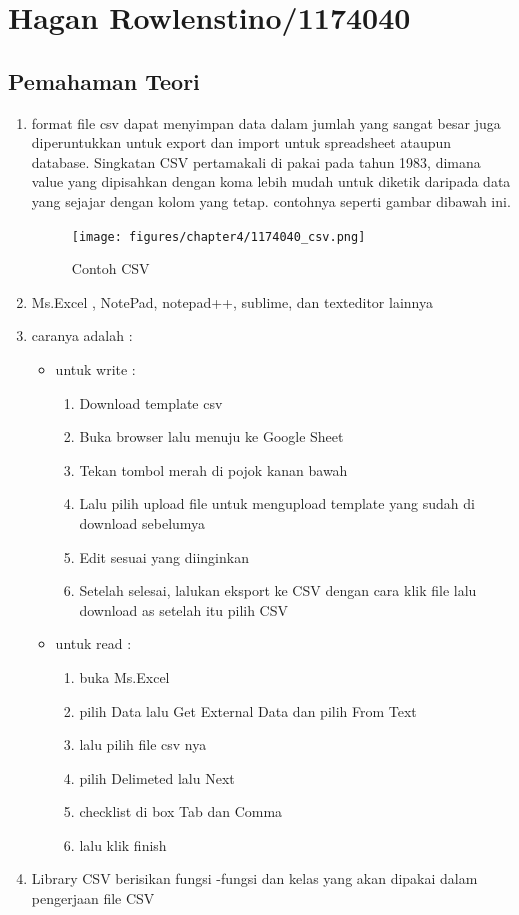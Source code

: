 \section{Hagan Rowlenstino/1174040}
	\subsection{Pemahaman Teori}
	\begin{enumerate}
	\item format file csv dapat menyimpan data dalam jumlah yang sangat besar juga diperuntukkan untuk export dan import untuk spreadsheet ataupun database. Singkatan CSV pertamakali di pakai pada tahun 1983, dimana value yang dipisahkan dengan koma lebih mudah untuk diketik daripada data yang sejajar dengan kolom yang tetap. contohnya seperti gambar dibawah ini.

	\begin{figure}[ht]
            \centerline{\texttt{[image: figures/chapter4/1174040\_csv.png]}}
            \caption{Contoh CSV}
            \label{1174040_csv}
            \end{figure}

	\item Ms.Excel , NotePad, notepad++, sublime, dan texteditor lainnya

	\item caranya adalah :
		\begin{itemize}
			\item untuk write :
			\begin{enumerate}
				\item Download template csv
				\item Buka browser lalu menuju ke Google Sheet
				\item Tekan tombol merah di pojok kanan bawah
				\item Lalu pilih upload file untuk mengupload template yang sudah di download sebelumya
				\item Edit sesuai yang diinginkan
				\item Setelah selesai, lalukan eksport ke CSV dengan cara klik file lalu download as setelah itu pilih CSV
			\end{enumerate}
			\item untuk read :
			\begin{enumerate}
				\item buka Ms.Excel
				\item pilih Data lalu Get External Data dan pilih From Text
				\item lalu pilih file csv nya
				\item pilih Delimeted lalu Next
				\item checklist di box Tab dan Comma
				\item lalu klik finish
			\end{enumerate}
		\end{itemize}	
	\item Library CSV berisikan fungsi -fungsi dan kelas yang akan dipakai dalam pengerjaan file CSV


\end{enumerate}
